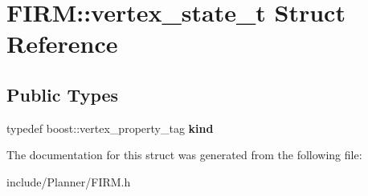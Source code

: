 \hypertarget{struct_f_i_r_m_1_1vertex__state__t}{\section{\-F\-I\-R\-M\-:\-:vertex\-\_\-state\-\_\-t \-Struct \-Reference}
\label{struct_f_i_r_m_1_1vertex__state__t}
}
\subsection*{\-Public \-Types}
\begin{DoxyCompactItemize}
\item 
\hypertarget{struct_f_i_r_m_1_1vertex__state__t_a1917aebbc6fd5d22c666bb6400546c15}{typedef boost\-::vertex\-\_\-property\-\_\-tag {\bfseries kind}}\label{struct_f_i_r_m_1_1vertex__state__t_a1917aebbc6fd5d22c666bb6400546c15}

\end{DoxyCompactItemize}


\-The documentation for this struct was generated from the following file\-:\begin{DoxyCompactItemize}
\item 
include/\-Planner/\-F\-I\-R\-M.\-h\end{DoxyCompactItemize}
